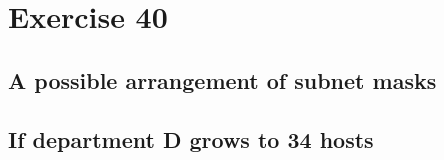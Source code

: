 \documentclass{article}
\begin{document}
\pagebreak{}

\pagebreak{}

\section{Exercise 40}
\subsection{A possible arrangement of subnet masks}

\subsection{If department D grows to 34 hosts}
\end{document}
